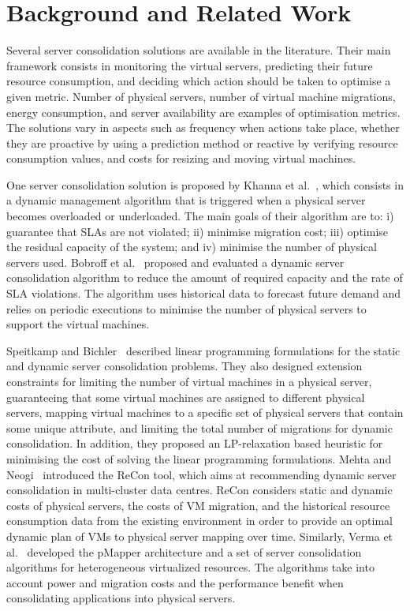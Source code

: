 \section{Background and Related Work}
\label{sec:background}

Several server consolidation solutions are available in the literature. Their main framework consists in monitoring the virtual servers, predicting their future resource consumption, and deciding which action should be taken to optimise a given metric. Number of physical servers, number of virtual machine migrations, energy consumption, and server availability are examples of optimisation metrics. The solutions vary in aspects such as frequency when actions take place, whether they are proactive by using a prediction method or reactive by verifying resource consumption values, and costs for resizing and moving virtual machines.

One server consolidation solution is proposed by Khanna et al.~\cite{khanna2006application}, which consists in a dynamic management algorithm that is triggered when a physical server becomes overloaded or underloaded. The main goals of their algorithm are to: i) guarantee that SLAs are not violated; ii) minimise migration cost; iii) optimise the residual capacity of the system; and iv) minimise the number of physical servers used. Bobroff et al.~\cite{bobroff2007dynamic} proposed and evaluated a dynamic server consolidation algorithm to reduce the amount of required capacity and the rate of SLA violations. The algorithm uses historical data to forecast future demand and relies on periodic executions to minimise the number of physical servers to support the virtual machines.

Speitkamp and Bichler~\cite{bichler2006capacity, speitkamp2010mathematical} described linear programming formulations for the static and dynamic server consolidation problems. They also designed extension constraints for limiting the number of virtual machines in a physical server, guaranteeing that some virtual machines are assigned to different physical servers, mapping virtual machines to a specific set of physical servers that contain some unique attribute, and limiting the total number of migrations for dynamic consolidation. In addition, they proposed an LP-relaxation based heuristic for minimising the cost of solving the linear programming formulations. Mehta and Neogi~\cite{mehta2008recon} introduced the ReCon tool, which aims at recommending dynamic server consolidation in multi-cluster data centres. ReCon considers static and dynamic costs of physical servers, the costs of VM migration, and the historical resource consumption data from the existing environment in order to provide an optimal dynamic plan of VMs to physical server mapping over time. Similarly, Verma et al.~\cite{verma2008pmapper} developed the pMapper architecture and a set of server consolidation algorithms for heterogeneous virtualized resources. The algorithms take into account power and migration costs and the performance benefit when consolidating applications into physical servers.

